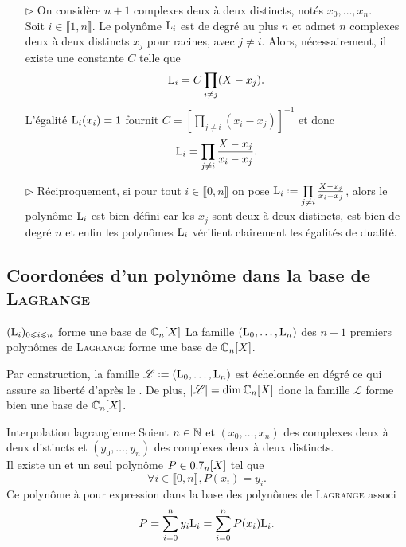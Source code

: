 \begin{preuve}
    \begin{itemize}
        \item[$\rhd$] On considère $n + 1$ complexes deux à deux distincts, notés $x_0, \dots, x_n$. \\
        Soit $i \in \llbracket 1, n \rrbracket$. Le polynôme $\mathrm{L}_i$ est de degré au plus $n$ et admet $n$ complexes deux à deux distincts $x_j$ pour racines, avec $j \not= i$. Alors, nécessairement, il existe une constante $C$ telle que 
        $$\mathrm{L}_i = C \prod_{i \not= j} (X-x_j).$$
        L'égalité $\mathrm{L}_i(x_i) = 1$ fournit $C = \left[ \prod\limits_{j \not=i}(x_i - x_j) \right]^{-1}$ et donc 
        $$\mathrm{L}_i = \prod_{j \neq i} \frac{X-x_j}{x_i - x_j}.$$
        \item[$\rhd$] Réciproquement, si pour tout $i \in \llbracket 0, n\rrbracket$ on pose $\Lag_i \defeq \prod\limits_{j \neq i} \frac{X-x_j}{x_i - x_j}$, alors le polynôme $\mathrm{L}_i$ est bien défini car les $x_j$ sont deux à deux distincts, est bien de degré $n$ et enfin les polynômes $\mathrm{L}_i$ vérifient clairement les égalités de dualité.
    \end{itemize}
\end{preuve}

\subsection{Coordonées d'un polynôme dans la base de \textsc{Lagrange}}

\begin{prop}{$(\mathrm{L}_i)_{0 \leqslant i \leqslant n}$ forme une base de $\mathbb{C}_n[X]$}
    La famille $(\mathrm{L}_0, \dots, \mathrm{L}_n)$ des $n+1$ premiers polynômes de \textsc{Lagrange} forme une base de $\mathbb{C}_n[X]$.
\end{prop}

\begin{preuve} 
    Par construction, la famille $\mathscr{L} \defeq (\Lag_0, \dots, \Lag_n)$ est échelonnée en dégré ce qui assure sa liberté d'après le . De plus, $|\mathscr{L}| = \dim \mathbb{C}_n[X]$ donc la famille $\mathscr{L}$ forme bien une base de $\mathbb{C}_n[X]$.
\end{preuve}

\begin{theo}{Interpolation lagrangienne}
Soient $n \in \mathbb{N}$ et $(x_0, \dots, x_n)$ des complexes deux à deux distincts et $(y_0, \dots, y_n)$ des complexes deux à deux distincts. \\
Il existe un et un seul polynôme $P \in 0.7_n[X]$ tel que 
$$\forall i \in \llbracket 0, n \rrbracket, P(x_i) = y_i.$$ 
Ce polynôme à pour expression dans la base des polynômes de \textsc{Lagrange} associ
$$P = \sum_{i=0}^n y_i \mathrm{L}_i = \sum_{i=0}^n P(x_i) \mathrm{L}_i.$$
\end{theo}

